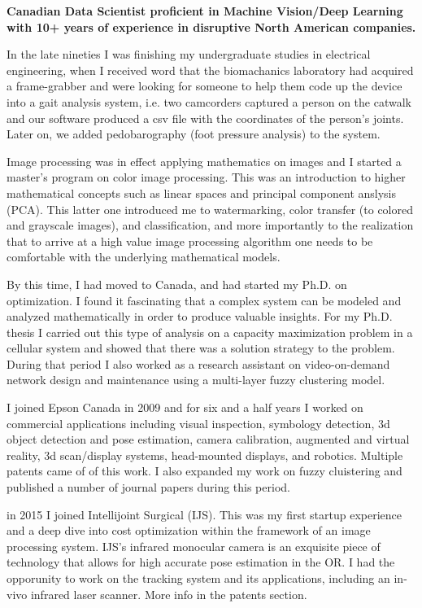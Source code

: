 \onehalfspace
\textbf{\large Canadian Data Scientist proficient in Machine Vision/Deep Learning with 10+ years of experience in 
disruptive North American companies.}
\singlespace

\vspace{1cm}

In the late nineties I was finishing my undergraduate studies in electrical engineering, when I received word that
the biomachanics laboratory had acquired a frame-grabber and were looking for someone to help them code up the device
into a gait analysis system, i.e. two camcorders captured a person on the catwalk and our software produced 
a csv file with the coordinates of the person's joints. Later on, we added pedobarography (foot pressure analysis) to the 
system. 

Image processing was in effect applying mathematics on images and I started a master's program on color image processing. 
This was an introduction to higher mathematical concepts such as linear spaces and principal component anslysis (PCA). This
latter one introduced me to watermarking, color transfer (to colored and grayscale images), and classification, and more 
importantly to the realization that to arrive at a high value image processing algorithm one needs to be comfortable with
the underlying mathematical models. 

By this time, I had moved to Canada, and had started my Ph.D. on optimization. I found it fascinating that a complex system can be 
modeled and analyzed mathematically in order to produce valuable insights. For my Ph.D. thesis I carried out this type of 
analysis on a capacity maximization problem in a cellular system and showed that there was a solution strategy to the problem. 
During that period I also worked as a research assistant on video-on-demand network design and maintenance using a multi-layer 
fuzzy clustering model.

I joined Epson Canada in 2009 and for six and a half years I worked on commercial applications including visual inspection, 
symbology detection, 3d object detection and pose estimation, camera calibration, augmented and virtual reality, 3d scan/display 
systems, head-mounted displays, and robotics. Multiple patents came of of this work. I also expanded my work on fuzzy cluistering 
and published a number of journal papers during this period.

in 2015 I joined Intellijoint Surgical (IJS). This was my first startup experience and a deep dive into cost optimization within 
the framework of an image processing system. IJS's infrared monocular camera is an exquisite piece of technology that allows for 
high accurate pose estimation in the OR. I had the opporunity to work on the tracking system and its applications, including 
an in-vivo infrared laser scanner. More info in the patents section.

